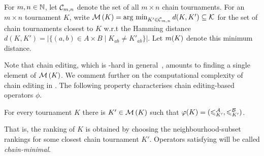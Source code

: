 \begin{definition}
    For $m, n \in \mathbb{N}$, let $\mathcal{C}_{m,n}$ denote the set of all $m \times n$
    chain tournaments. For an $m \times n$ tournament $K$,
    write $\operatorname{\mathcal{M}}\left({K}\right) = \operatorname*{arg\ min}_{K' \in \mathcal{C}_{m,n}}{d(K, K')} \subseteq \mathcal{K}$ for
    the set of chain tournaments closest to $K$ w.r.t the Hamming
    distance $d(K, K') = |\{(a,b) \in A \times B \mid K_{ab} \ne K'_{ab}\}|$.
    Let $m({K})$ denote this minimum distance.
\end{definition}

Note that chain editing, which is -hard in
general~\cite{jiao2017algorithms}, amounts to finding a single element of
$\operatorname{\mathcal{M}}\left({K}\right)$.\footnotemark{} We comment further on the computational complexity
of chain editing in . The following
property characterises chain editing-based operators $\phi$.


\begin{axiom}
    For every tournament $K$ there is $K' \in \operatorname{\mathcal{M}}\left({K}\right)$ such that $\varphi(K) =
    ({\leqslant^{\mathcal{A}}_{K'}}, {\leqslant^{\mathcal{B}}_{K'}})$.
\end{axiom}

\sloppy
That is, the ranking of $K$ is obtained by choosing the neighbourhood-subset
rankings for some closest chain tournament $K'$. Operators satisfying
 will be called \emph{chain-minimal}.

